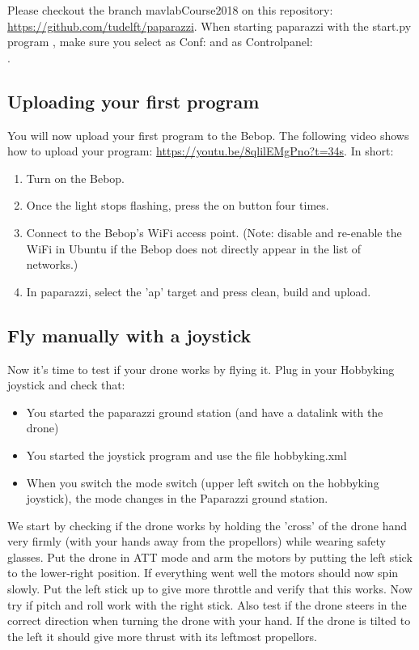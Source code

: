 \documentclass{article}
\begin{document}
Please checkout the branch mavlabCourse2018 on this repository: \url{https://github.com/tudelft/paparazzi}.
When starting paparazzi with the start.py program , make sure you select as Conf:  and as Controlpanel:\\ . 

\subsection*{Uploading your first program}
You will now upload your first program to the Bebop.
The following video shows how to upload your program: \url{https://youtu.be/8qlilEMgPno?t=34s}.
In short:
\begin{enumerate}
\item Turn on the Bebop.
\item Once the light stops flashing, press the on button four times.
\item Connect to the Bebop's WiFi access point. (Note: disable and re-enable the WiFi in Ubuntu if the Bebop does not directly appear in the list of networks.)
\item In paparazzi, select the 'ap' target and press clean, build and upload.
\end{enumerate}



\subsection*{Fly manually with a joystick }
Now it's time to test if your drone works by flying it. Plug in your Hobbyking joystick and check that:
\begin{itemize}
\item You started the paparazzi ground station (and have a datalink with the drone)
\item You started the joystick program and use the file hobbyking.xml
\item When you switch the mode switch (upper left switch on the hobbyking joystick), the mode changes in the Paparazzi ground station.
\end{itemize}

We start by checking if the drone works by holding the 'cross' of the drone hand very firmly (with your hands away from the propellors) while wearing safety glasses. Put the drone in ATT mode and arm the motors by putting the left stick to the lower-right position. If everything went well the motors should now spin slowly. Put the left stick up to give more throttle and verify that this works. Now try if pitch and roll work with the right stick. 
Also test if the drone steers in the correct direction when turning the drone with your hand. If the drone is tilted to the left it should give more thrust with its leftmost propellors. 
\end{document}
